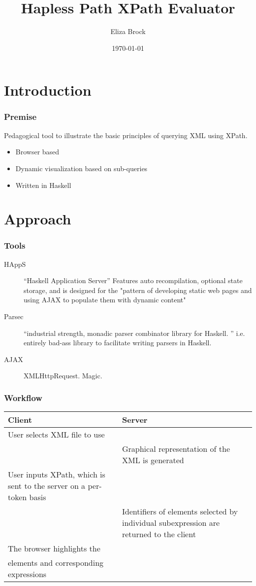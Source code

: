\documentclass{beamer}
\title{Hapless Path XPath Evaluator}
\author{Eliza Brock}
\date{\today}
\begin{document}
\begin{frame}
\titlepage
\end{frame}

\section{Introduction}
\begin{frame}
\frametitle{Premise}
Pedagogical tool to illustrate the basic principles of querying XML using XPath. 
\begin{itemize}
\pause
\item Browser based
\pause
\item Dynamic visualization based on sub-queries
\pause
\item Written in Haskell
\end{itemize}
\end{frame}

\section{Approach}
\begin{frame}
\frametitle{Tools}
\begin{description}
\item[HAppS] ``Haskell Application Server'' Features auto recompilation, optional state storage, and is designed for the "pattern of developing static web pages and using AJAX to populate them with dynamic content"
\pause
\item[Parsec] ``industrial strength, monadic parser combinator library for Haskell. '' \cite{parsec} i.e. entirely bad-ass library to facilitate writing parsers in Haskell.
\pause
\item[AJAX] XMLHttpRequest. Magic.
\end{description}
\end{frame}

\begin{frame}
\frametitle{Workflow}
\begin{tabular*}{\textwidth}{p{} | p{}}
\textbf{Client}					&	\textbf{Server}\\
\hline
\hline
User selects XML file to use	&	\\
\hline
								&	Graphical representation of the XML is generated \\
\hline
User inputs XPath, which is sent to the server on a per-token basis & \\
\hline
								& Identifiers of elements selected by individual
 subexpression are returned to the client \\
\hline The browser highlights the \\
elements and corresponding expressions & \\
\end{tabular*}
\end{frame}
\end{document}
